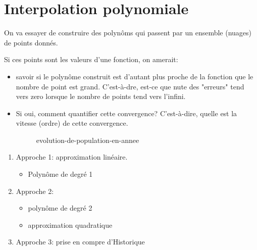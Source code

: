 \chapter{Interpolation polynomiale}
On va essayer de construire des polynôms qui passent par un ensemble (nuages) de points donnés.

Si ces points sont les valeurs d'une fonction, on amerait:
\begin{itemize}
    \item savoir si le polynôme construit est d'autant plus proche de la fonction que le nombre de point est grand. C'est-à-dre, est-ce que nute des "erreurs" tend vers zero lorsque le nombre de points tend vers l'infini.
    \item Si oui, comment quantifier cette convergence? C'est-à-dire, quelle est la vitesse (ordre) de cette convergence.
        \begin{figure}[H]
            \centering
            \caption{evolution-de-population-en-annee}
            \label{fig:evolution-de-population-en-annee}
        \end{figure}
\end{itemize}
\begin{enumerate}
    \item Approche 1: approximation linéaire. 
        \begin{itemize}
            \item Polynôme de degré 1
        \end{itemize}
    \item Approche 2: 
        \begin{itemize}
            \item polynôme de degré 2
            \item approximation quadratique
        \end{itemize}
    \item Approche 3: prise en compre d'Historique
\end{enumerate}

